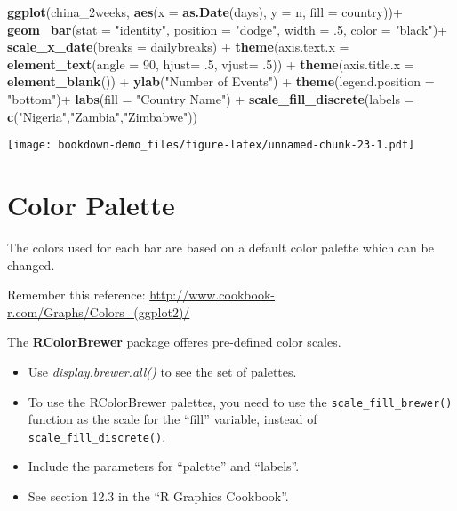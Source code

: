 \documentclass[]{book}
\newenvironment{Shaded}{\begin{snugshade}}{\end{snugshade}}
\newcommand{\KeywordTok}[1]{\textcolor[rgb]{0.13,0.29,0.53}{\textbf{{#1}}}}
\newcommand{\DataTypeTok}[1]{\textcolor[rgb]{0.13,0.29,0.53}{{#1}}}
\newcommand{\DecValTok}[1]{\textcolor[rgb]{0.00,0.00,0.81}{{#1}}}
\newcommand{\StringTok}[1]{\textcolor[rgb]{0.31,0.60,0.02}{{#1}}}
\newcommand{\NormalTok}[1]{{#1}}
\theoremstyle{definition}
\theoremstyle{definition}
\theoremstyle{remark}
\begin{document}
\begin{Shaded}
\begin{Highlighting}[]
\KeywordTok{ggplot}\NormalTok{(china_2weeks, }\KeywordTok{aes}\NormalTok{(}\DataTypeTok{x =} \KeywordTok{as.Date}\NormalTok{(days), }\DataTypeTok{y =} \NormalTok{n, }\DataTypeTok{fill =} \NormalTok{country))+}
\StringTok{  }\KeywordTok{geom_bar}\NormalTok{(}\DataTypeTok{stat =} \StringTok{"identity"}\NormalTok{, }\DataTypeTok{position =} \StringTok{"dodge"}\NormalTok{, }\DataTypeTok{width =} \NormalTok{.}\DecValTok{5}\NormalTok{, }\DataTypeTok{color =} \StringTok{"black"}\NormalTok{)+}
\StringTok{  }\KeywordTok{scale_x_date}\NormalTok{(}\DataTypeTok{breaks =} \NormalTok{dailybreaks) +}
\StringTok{  }\KeywordTok{theme}\NormalTok{(}\DataTypeTok{axis.text.x =} \KeywordTok{element_text}\NormalTok{(}\DataTypeTok{angle =} \DecValTok{90}\NormalTok{, }\DataTypeTok{hjust=} \NormalTok{.}\DecValTok{5}\NormalTok{, }\DataTypeTok{vjust=} \NormalTok{.}\DecValTok{5}\NormalTok{)) +}
\StringTok{  }\KeywordTok{theme}\NormalTok{(}\DataTypeTok{axis.title.x =} \KeywordTok{element_blank}\NormalTok{()) +}
\StringTok{  }\KeywordTok{ylab}\NormalTok{(}\StringTok{"Number of Events"}\NormalTok{) +}
\StringTok{  }\KeywordTok{theme}\NormalTok{(}\DataTypeTok{legend.position =} \StringTok{"bottom"}\NormalTok{)+}
\StringTok{  }\KeywordTok{labs}\NormalTok{(}\DataTypeTok{fill =} \StringTok{"Country Name"}\NormalTok{) +}
\StringTok{  }\KeywordTok{scale_fill_discrete}\NormalTok{(}\DataTypeTok{labels =} \KeywordTok{c}\NormalTok{(}\StringTok{"Nigeria"}\NormalTok{,}\StringTok{"Zambia"}\NormalTok{,}\StringTok{"Zimbabwe"}\NormalTok{))}
\end{Highlighting}
\end{Shaded}

\texttt{[image: bookdown-demo\_files/figure-latex/unnamed-chunk-23-1.pdf]}

\section{Color Palette}\label{color-palette}

The colors used for each bar are based on a default color palette which
can be changed.

Remember this reference:
\url{http://www.cookbook-r.com/Graphs/Colors_(ggplot2)/}

The \textbf{RColorBrewer} package offeres pre-defined color scales.

\begin{itemize}
\item
  Use \emph{display.brewer.all()} to see the set of palettes.
\item
  To use the RColorBrewer palettes, you need to use the
  \texttt{scale\_fill\_brewer()} function as the scale for the ``fill''
  variable, instead of \texttt{scale\_fill\_discrete()}.
\item
  Include the parameters for ``palette'' and ``labels''.
\item
  See section 12.3 in the ``R Graphics Cookbook''.
\end{itemize}
\end{document}
